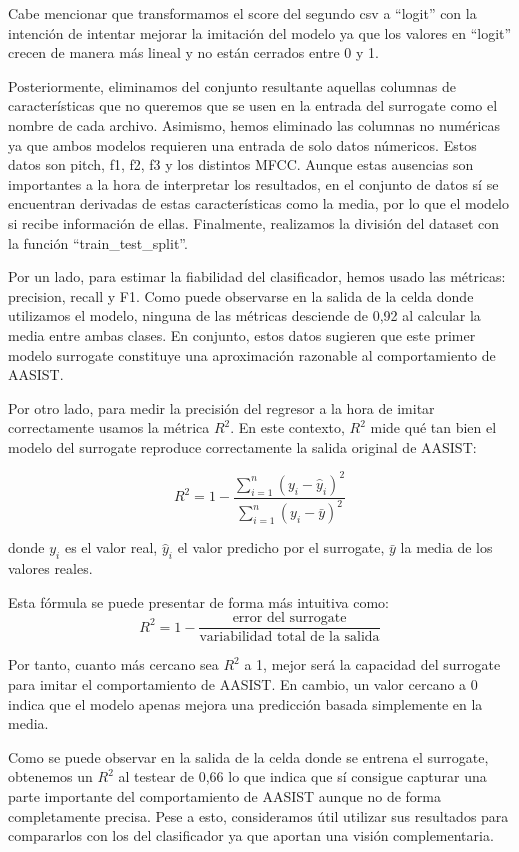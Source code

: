Cabe mencionar que transformamos el score del segundo csv a ``logit'' con la intención de intentar mejorar la imitación del modelo ya que los valores en ``logit'' crecen de manera más lineal y no están cerrados entre 0 y 1.

Posteriormente, eliminamos del conjunto resultante aquellas columnas de características que no queremos que se usen en la entrada del surrogate como el nombre de cada archivo. Asimismo, hemos eliminado las columnas no numéricas ya que ambos modelos requieren una entrada de solo datos númericos. Estos datos son pitch, f1, f2, f3 y los distintos MFCC. Aunque estas ausencias son importantes a la hora de interpretar los resultados, en el conjunto de datos sí se encuentran derivadas de estas características como la media, por lo que el modelo si recibe información de ellas. Finalmente, realizamos la división del dataset con la función ``train\_test\_split''. 

Por un lado, para estimar la fiabilidad del clasificador, hemos usado las métricas: precision, recall y F1. Como puede observarse en la salida de la celda donde utilizamos el modelo, ninguna de las métricas desciende de 0,92 al calcular la media entre ambas clases. En conjunto, estos datos sugieren que este primer modelo surrogate constituye una aproximación razonable al comportamiento de AASIST.

Por otro lado, para medir la precisión del regresor a la hora de imitar correctamente usamos la métrica  $R^2$. En este contexto, $R^2$ mide qué tan bien el modelo del surrogate reproduce correctamente la salida original de AASIST: 

\[R^2 = 1 - \frac{\sum_{i=1}^{n} (y_i - \hat{y}_i)^2}{\sum_{i=1}^{n} (y_i - \bar{y})^2}\]

donde $y_i$ es el valor real, $\hat{y}_i$ el valor predicho por el surrogate, $\bar{y}$ la media de los valores reales.

Esta fórmula se puede presentar de forma más intuitiva como: 
\[
R^2 = 1 - \frac{\text{error del surrogate}}{\text{variabilidad total de la salida}}
\]

Por tanto, cuanto más cercano sea $R^2$ a 1, mejor será la capacidad del surrogate para imitar el comportamiento de AASIST. En cambio, un valor cercano a 0 indica que el modelo apenas mejora una predicción basada simplemente en la media.

Como se puede observar en la salida de la celda donde se entrena el surrogate, obtenemos un $R^2$ al testear de 0,66 lo que indica que sí consigue capturar una parte importante del comportamiento de AASIST aunque no de forma completamente precisa. Pese a esto, consideramos útil utilizar sus resultados para compararlos con los del clasificador ya que aportan una visión complementaria.

